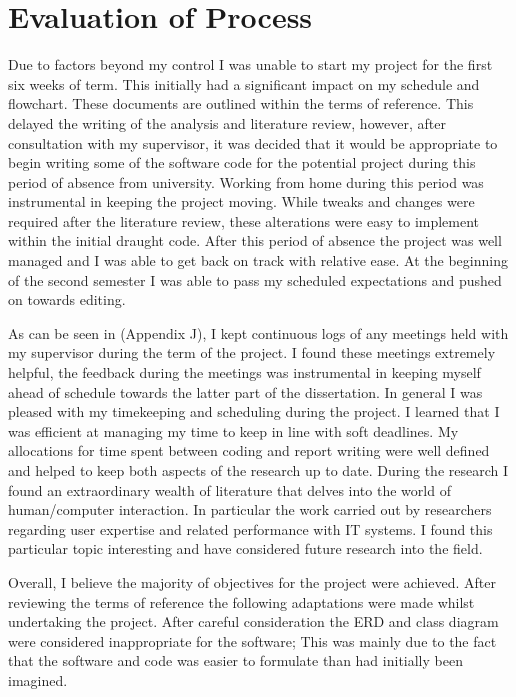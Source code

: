 \section{Evaluation of Process}

Due to factors beyond my control I was unable to start my project for the first six weeks of term. This initially had a significant impact on my schedule and flowchart. These documents are outlined within the terms of reference. This delayed the writing of the analysis and literature review, however, after consultation with my supervisor, it was decided that it would be appropriate to begin writing some of the software code for the potential project during this period of absence from university. Working from home during this period was instrumental in keeping the project moving. While tweaks and changes were required after the literature review, these alterations were easy to implement within the initial draught code. After this period of absence the project was well managed and I was able to get back on track with relative ease. At the beginning of the second semester I was able to pass my scheduled expectations and pushed on towards editing.

As can be seen in (Appendix J), I kept continuous logs of any meetings held with my supervisor during the term of the project. I found these meetings extremely helpful, the feedback during the meetings was instrumental in keeping myself ahead of schedule towards the latter part of the dissertation. In general I was pleased with my timekeeping and scheduling during the project. I learned that I was efficient at managing my time to keep in line with soft deadlines. My allocations for time spent between coding and report writing were well defined and helped to keep both aspects of the research up to date. During the research I found an extraordinary wealth of literature that delves into the world of human/computer interaction. In particular the work carried out by researchers regarding user expertise and related performance with IT systems. I found this particular topic interesting and have considered future research into the field.

Overall, I believe the majority of objectives for the project were achieved. After reviewing the terms of reference the following adaptations were made whilst undertaking the project. After careful consideration the ERD and class diagram were considered inappropriate for the software; This was mainly due to the fact that the software and code was easier to formulate than had initially been imagined.


